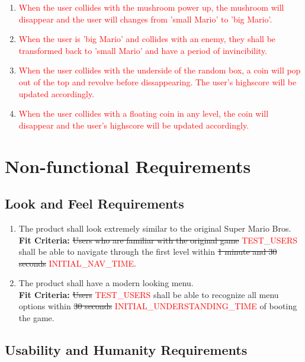 \documentclass[12pt, titlepage]{article}
\begin{document}
\begin{enumerate}[{FR}1. ]
    \item \textcolor{red}{When the user collides with the mushroom power up, the mushroom will disappear and the user will changes from 'small Mario' to 'big Mario'.}
    \item \textcolor{red}{When the user is 'big Mario' and collides with an enemy, they shall be transformed back to 'small Mario' and have a period of invincibility.}
    \item \textcolor{red}{When the user collides with the underside of the random box, a coin will pop out of the top and revolve before dissappearing. The user's highscore will be updated accordingly.}
    \item \textcolor{red}{When the user collides with a floating coin in any level, the coin will disappear and the user's highscore will be updated accordingly.}
\end{enumerate}
\section{Non-functional Requirements}

\subsection{Look and Feel Requirements}
\begin{enumerate}[{LF}1. ]
    \item The product shall look extremely similar to the original Super Mario Bros.\\
    \textbf{Fit Criteria:} \sout{Users who are familiar with the original game} \textcolor{red}{TEST\_USERS} shall be able to navigate through the first level within \sout{1 minute and 30 seconds} \textcolor{red}{INITIAL\_NAV\_TIME}.
    \item The product shall have a modern looking menu.\\
    \textbf{Fit Criteria:} \sout{Users} \textcolor{red}{TEST\_USERS} shall be able to recognize all menu options within \sout{30 seconds} \textcolor{red}{INITIAL\_UNDERSTANDING\_TIME} of booting the game.
\end{enumerate}



\subsection{Usability and Humanity Requirements}
\end{document}
